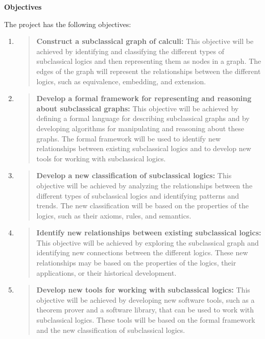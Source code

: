 \textbf{Objectives}

The project has the following objectives:

\begin{enumerate}
\def\labelenumi{\arabic{enumi}.}
\item
  \begin{quote}
  \textbf{Construct a subclassical graph of calculi:} This objective
  will be achieved by identifying and classifying the different types of
  subclassical logics and then representing them as nodes in a graph.
  The edges of the graph will represent the relationships between the
  different logics, such as equivalence, embedding, and extension.
  \end{quote}
\item
  \begin{quote}
  \textbf{Develop a formal framework for representing and reasoning
  about subclassical graphs:} This objective will be achieved by
  defining a formal language for describing subclassical graphs and by
  developing algorithms for manipulating and reasoning about these
  graphs. The formal framework will be used to identify new
  relationships between existing subclassical logics and to develop new
  tools for working with subclassical logics.
  \end{quote}
\item
  \begin{quote}
  \textbf{Develop a new classification of subclassical logics:} This
  objective will be achieved by analyzing the relationships between the
  different types of subclassical logics and identifying patterns and
  trends. The new classification will be based on the properties of the
  logics, such as their axioms, rules, and semantics.
  \end{quote}
\item
  \begin{quote}
  \textbf{Identify new relationships between existing subclassical
  logics:} This objective will be achieved by exploring the subclassical
  graph and identifying new connections between the different logics.
  These new relationships may be based on the properties of the logics,
  their applications, or their historical development.
  \end{quote}
\item
  \begin{quote}
  \textbf{Develop new tools for working with subclassical logics:} This
  objective will be achieved by developing new software tools, such as a
  theorem prover and a software library, that can be used to work with
  subclassical logics. These tools will be based on the formal framework
  and the new classification of subclassical logics.
  \end{quote}
\end{enumerate}

